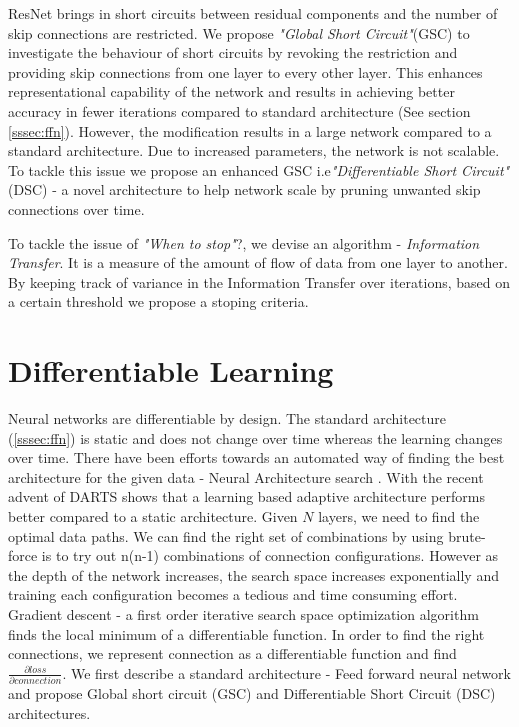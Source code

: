 \documentclass{article}
\begin{document}
ResNet brings in short circuits between residual components and the number of skip connections are restricted. We propose \emph{"Global Short Circuit"}(GSC) to investigate the behaviour of short circuits by revoking the restriction and providing skip connections from one layer to every other layer. This enhances representational capability of the network and results in achieving better accuracy in fewer iterations compared to standard architecture (See section \ref{sssec:ffn}). However, the modification results in a large network compared to a standard architecture. Due to increased parameters, the network is not scalable. To tackle this issue we propose an enhanced GSC i.e\emph{"Differentiable Short Circuit"}(DSC) - a novel architecture to help network scale by pruning unwanted skip connections over time.

To tackle the issue of \emph{"When to stop"}?, we devise an algorithm - \emph{Information Transfer}. It is a measure of the amount of flow of data from one layer to another. By keeping track of variance in the Information Transfer over iterations, based on a certain threshold we propose a stoping criteria.

\section{Differentiable Learning}
\label{sec:headings}

Neural networks are differentiable by design. The standard architecture (\ref{sssec:ffn}) is static and does not change over time whereas the learning changes over time. There have been efforts towards an automated way of finding the best architecture for the given data - Neural Architecture search \cite{Zoph2016NeuralAS}. With the recent advent of DARTS \cite{Liu2019DARTSDA} shows that a learning based adaptive architecture performs better compared to a static architecture. Given $N$ layers, we need to find the optimal data paths. We can find the right set of combinations by using brute-force is to try out n(n-1) combinations of connection configurations. However as the depth of the network increases, the search space increases exponentially and training each configuration becomes a tedious and time consuming effort. Gradient descent \cite{ruder2016overview} - a first order iterative search space optimization algorithm finds the local minimum of a differentiable function. In order to find the right connections, we represent connection as a differentiable function and find $\frac{\partial loss}{\partial connection}$. We first describe a standard architecture - Feed forward neural network and propose Global short circuit (GSC) and Differentiable Short Circuit (DSC) architectures.
\end{document}
